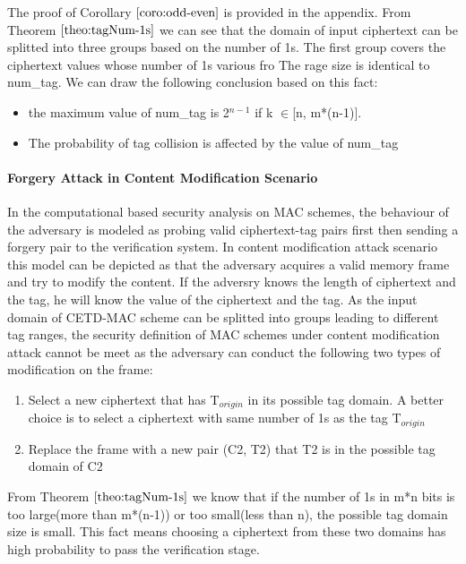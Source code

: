 The proof of Corollary $\ref{coro:odd-even}$ is provided in the appendix. 
From Theorem $\ref{theo:tagNum-1s}$ we can see that the domain of input ciphertext can be splitted into three groups based on the number of 1s. The first group covers the ciphertext values whose number of 1s various fro The rage size is identical to num\_tag. We can draw the following conclusion based on this fact:
\begin{itemize}
	\item the maximum value of num\_tag is 2$^{n-1}$ if k $\in$[n, m*(n-1)]. 
	\item The probability of tag collision is affected by the value of num\_tag
\end{itemize}
\paragraph{Forgery Attack in Content Modification Scenario}
In the computational based security analysis on MAC schemes, the behaviour of the adversary is modeled as probing valid ciphertext-tag pairs first then sending a forgery pair to the verification system. In content modification attack scenario this model can be depicted as that the adversary acquires a valid memory frame and try to modify the content. If the adversry knows the length of ciphertext and the tag, he will know the value of the ciphertext and the tag. 
As the input domain of CETD-MAC scheme can be splitted into groups leading to different tag ranges, the security definition of MAC schemes under content modification attack cannot be meet as the adversary can conduct the following two types of modification on the frame:
\begin{enumerate}
	\item Select a new ciphertext that has T$_{origin}$ in its possible tag domain. A better choice is to select a ciphertext with same number of 1s as the tag T$_{origin}$
	\item Replace the frame with a new pair (C2, T2) that T2 is in the possible tag domain of C2
\end{enumerate}
From Theorem $\ref{theo:tagNum-1s}$ we know that if the number of 1s in m*n bits is too large(more than m*(n-1)) or too small(less than n), the possible tag domain size is small. This fact means choosing a ciphertext from these two domains has high probability to pass the verification stage.


